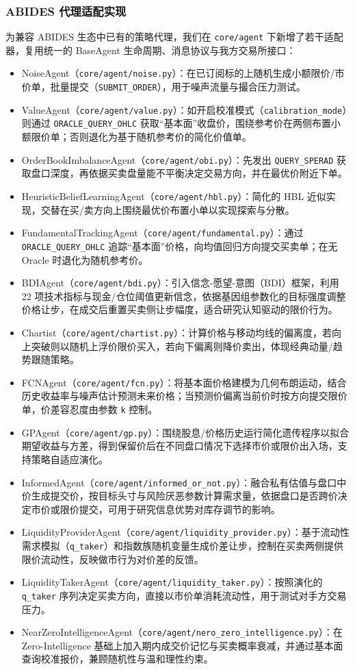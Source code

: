 \subsubsection{ABIDES 代理适配实现}
为兼容 ABIDES 生态中已有的策略代理，我们在 \verb|core/agent| 下新增了若干适配器，复用统一的 BaseAgent 生命周期、消息协议与我方交易所接口：
\begin{itemize}
  \item NoiseAgent（\verb|core/agent/noise.py|）：在已订阅标的上随机生成小额限价/市价单，批量提交（\verb|SUBMIT_ORDER|），用于噪声流量与撮合压力测试。
  \item ValueAgent（\verb|core/agent/value.py|）：如开启校准模式（\verb|calibration_mode|）则通过 \verb|ORACLE_QUERY_OHLC| 获取“基本面”收盘价，围绕参考价在两侧布置小额限价单；否则退化为基于随机参考价的简化价值单。
  \item OrderBookImbalanceAgent（\verb|core/agent/obi.py|）：先发出 \verb|QUERY_SPERAD| 获取盘口深度，再依据买卖盘量能不平衡决定交易方向，并在最优价附近下单。
  \item HeuristicBeliefLearningAgent（\verb|core/agent/hbl.py|）：简化的 HBL 近似实现，交替在买/卖方向上围绕最优价布置小单以实现探索与分散。
  \item FundamentalTrackingAgent（\verb|core/agent/fundamental.py|）：通过 \verb|ORACLE_QUERY_OHLC| 追踪“基本面”价格，向均值回归方向提交买卖单；在无 Oracle 时退化为随机参考价。
  \item BDIAgent（\verb|core/agent/bdi.py|）：引入信念-愿望-意图（BDI）框架，利用 22 项技术指标与现金/仓位阈值更新信念，依据基因组参数化的目标强度调整价格让步，在成交后重置买卖侧让步幅度，适合研究认知驱动的限价行为。
  \item Chartist（\verb|core/agent/chartist.py|）：计算价格与移动均线的偏离度，若向上突破则以随机上浮价限价买入，若向下偏离则降价卖出，体现经典动量/趋势跟随策略。
  \item FCNAgent（\verb|core/agent/fcn.py|）：将基本面价格建模为几何布朗运动，结合历史收益率与噪声估计预测未来价格；当预测价偏离当前价时按方向提交限价单，价差容忍度由参数 \verb|k| 控制。
  \item GPAgent（\verb|core/agent/gp.py|）：围绕股息/价格历史运行简化遗传程序以拟合期望收益与方差，得到保留价后在不同盘口情况下选择市价或限价出入场，支持策略自适应演化。
  \item InformedAgent（\verb|core/agent/informed_or_not.py|）：融合私有估值与盘口中价生成提交价，按目标头寸与风险厌恶参数计算需求量，依据盘口是否跨价决定市价或限价提交，可用于研究信息优势对库存调节的影响。
  \item LiquidityProviderAgent（\verb|core/agent/liquidity_provider.py|）：基于流动性需求模拟（\verb|q_taker|）和指数族随机变量生成价差让步，控制在买卖两侧提供限价流动性，反映做市行为对价差的反馈。
  \item LiquidityTakerAgent（\verb|core/agent/liquidity_taker.py|）：按照演化的 \verb|q_taker| 序列决定买卖方向，直接以市价单消耗流动性，用于测试对手方交易压力。
  \item NearZeroIntelligenceAgent（\verb|core/agent/nero_zero_intelligence.py|）：在 Zero-Intelligence 基础上加入期内成交价记忆与买卖概率衰减，并通过基本面查询校准报价，兼顾随机性与温和理性约束。
\end{itemize}

